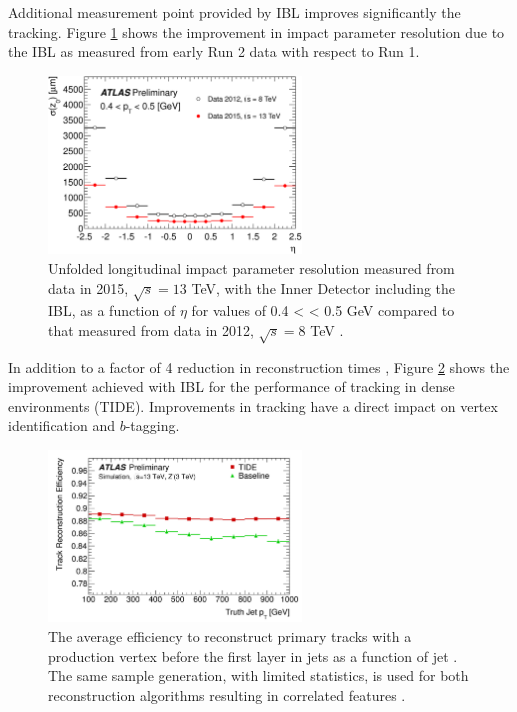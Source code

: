 Additional measurement point provided by IBL improves significantly the tracking. Figure \ref{fig:chap2:ATLAS:ITK:IBL:Imp} shows the improvement in impact parameter resolution due to the IBL as measured from early Run 2 data with respect to Run 1. 
\begin{figure}[H]
    \centering
    \includegraphics[width=0.6\textwidth]{Ch2/Img/IBL_impact.png}
    \caption{Unfolded longitudinal impact parameter resolution measured from data in 2015, $\sqrt{s}= 13$ TeV, with the Inner Detector including the IBL, as a function of $\eta$  for values of 0.4 < \pT < 0.5 GeV compared to that measured from data in 2012, $\sqrt{s} = 8$ TeV \cite{IBL_IP}.}
    \label{fig:chap2:ATLAS:ITK:IBL:Imp}
\end{figure}
In addition to a factor of 4 reduction in reconstruction times \cite{IBL_Time}, Figure \ref{fig:chap2:ATLAS:ITK:IBL:Trk} shows the improvement achieved with IBL for the performance of tracking in dense environments (TIDE). Improvements in tracking have a direct impact on vertex identification and $b$-tagging. 
\begin{figure}[H]
    \centering
    \includegraphics[width=0.6\textwidth]{Ch2/Img/IBL_track.png}
    \caption{The average efficiency to reconstruct primary tracks with a production vertex before the first layer in jets as a function of jet \pT. The same sample generation, with limited statistics, is used for both reconstruction algorithms resulting in correlated features \cite{IBL_Trk}.}
    \label{fig:chap2:ATLAS:ITK:IBL:Trk}
\end{figure}
